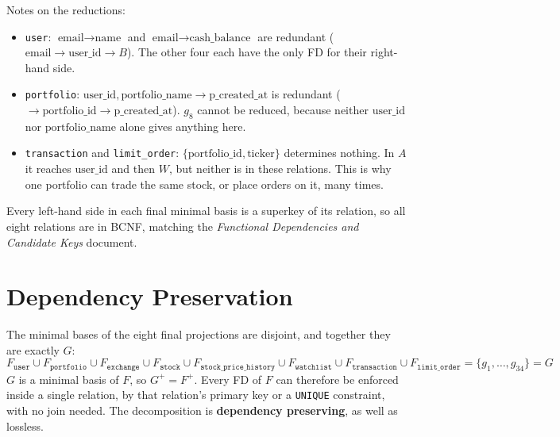 \documentclass{article}
\newcommand{\at}[1]{\text{#1}}
\begin{document}
Notes on the reductions:
\begin{itemize}[leftmargin=*]
  \item \texttt{user}: $\at{email} \rightarrow \at{name}$ and $\at{email} \rightarrow \at{cash\_balance}$ are redundant ($\at{email} \rightarrow \at{user\_id} \rightarrow B$). The other four each have the only FD for their right-hand side.
  \item \texttt{portfolio}: $\at{user\_id}, \at{portfolio\_name} \rightarrow \at{p\_created\_at}$ is redundant ($\rightarrow \at{portfolio\_id} \rightarrow \at{p\_created\_at}$). $g_8$ cannot be reduced, because neither $\at{user\_id}$ nor $\at{portfolio\_name}$ alone gives anything here.
  \item \texttt{transaction} and \texttt{limit\_order}: $\{\at{portfolio\_id}, \at{ticker}\}$ determines nothing. In $A$ it reaches $\at{user\_id}$ and then $W$, but neither is in these relations. This is why one portfolio can trade the same stock, or place orders on it, many times.
\end{itemize}
Every left-hand side in each final minimal basis is a superkey of its relation, so all eight relations are in BCNF, matching the \emph{Functional Dependencies and Candidate Keys} document.

\section{Dependency Preservation}

The minimal bases of the eight final projections are disjoint, and together they are exactly $G$:
\[
  F_{\texttt{user}} \cup F_{\texttt{portfolio}} \cup F_{\texttt{exchange}} \cup F_{\texttt{stock}} \cup F_{\texttt{stock\_price\_history}} \cup F_{\texttt{watchlist}} \cup F_{\texttt{transaction}} \cup F_{\texttt{limit\_order}} = \{g_1, \dots, g_{34}\} = G
\]
$G$ is a minimal basis of $F$, so $G^+ = F^+$. Every FD of $F$ can therefore be enforced inside a single relation, by that relation's primary key or a \texttt{UNIQUE} constraint, with no join needed. The decomposition is \textbf{dependency preserving}, as well as lossless.
\end{document}
